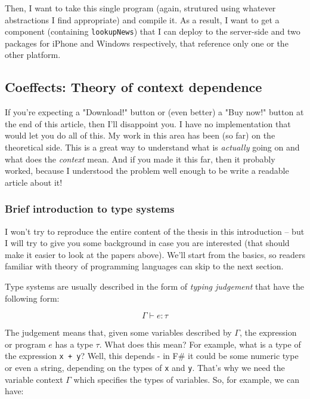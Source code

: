 Then, I want to take this single program (again, strutured using whatever abstractions
I find appropriate) and compile it. As a result, I want to get a component (containing
\texttt{lookupNews}) that I can deploy to the server-side and two packages for iPhone and 
Windows respectively, that reference only one or the other platform.


\subsection{Coeffects: Theory of context dependence}

If you're expecting a "Download!" button or (even better) a "Buy now!" button at the end of this article,
then I'll disappoint you. I have no implementation that would let you do all of this.
My work in this area has been (so far) on the theoretical side. This is a great way to 
understand what is \emph{actually} going on and what does the \emph{context} mean. And if you made
it this far, then it probably worked, because I understood the problem well enough to be 
write a readable article about it!

\subsubsection{Brief introduction to type systems}

I won't try to reproduce the entire content of the thesis in this introduction -- but I will
try to give you some background in case you are interested (that should make it easier to
look at the papers above). We'll start from the basics, so readers familiar with theory of 
programming languages can skip to the next section.

Type systems are usually described in the form of \emph{typing judgement} that have the following form:

\begin{equation}
\Gamma \vdash e : \tau
\end{equation}

The judgement means that, given some variables described by $\Gamma$, the expression or program $e$
has a type $\tau$. What does this mean? For example, what is a type of the expression \texttt{x + y}?
Well, this depends - in F\# it could be some numeric type or even a string, depending on the types
of \texttt{x} and \texttt{y}. That's why we need the variable context $\Gamma$ which specifies the types of variables.
So, for example, we can have:

